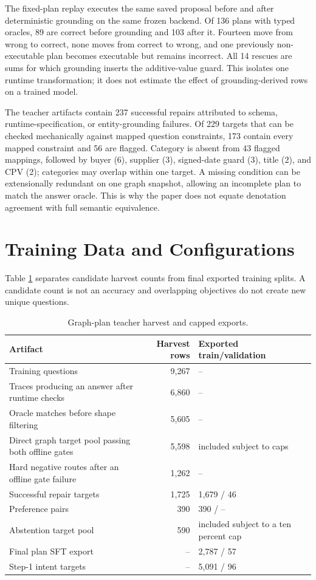 The fixed-plan replay executes the same saved proposal before and after deterministic grounding on
the same frozen backend.  Of 136 plans with typed oracles, 89 are correct before grounding and 103
after it.  Fourteen move from wrong to correct, none moves from correct to wrong, and one previously
non-executable plan becomes executable but remains incorrect.  All 14 rescues are sums for which
grounding inserts the additive-value guard.  This isolates one runtime transformation; it does not
estimate the effect of grounding-derived rows on a trained model.

The teacher artifacts contain 237 successful repairs attributed to schema, runtime-specification,
or entity-grounding failures.  Of 229 targets that can be checked mechanically against mapped
question constraints, 173 contain every mapped constraint and 56 are flagged.  Category is absent
from 43 flagged mappings, followed by buyer (6), supplier (3), signed-date guard (3), title (2), and
CPV (2); categories may overlap within one target.  A missing condition can be extensionally
redundant on one graph snapshot, allowing an incomplete plan to match the answer oracle.  This is
why the paper does not equate denotation agreement with full semantic equivalence.

\section{Training Data and Configurations}
\label{app:config}

Table \ref{tab:training-data} separates candidate harvest counts from final exported training
splits.  A candidate count is not an accuracy and overlapping objectives do not create new unique
questions.

\begin{table}[h]
  \centering
  \caption{Graph-plan teacher harvest and capped exports.}
  \label{tab:training-data}
  \small
  \begin{tabularx}{\linewidth}{XrX}
    \toprule
    Artifact & Harvest rows & Exported train/validation \\
    \midrule
    Training questions & 9,267 & -- \\
    Traces producing an answer after runtime checks & 6,860 & -- \\
    Oracle matches before shape filtering & 5,605 & -- \\
    Direct graph target pool passing both offline gates & 5,598 & included subject to caps \\
    Hard negative routes after an offline gate failure & 1,262 & -- \\
    Successful repair targets & 1,725 & 1,679 / 46 \\
    Preference pairs & 390 & 390 / -- \\
    Abstention target pool & 590 & included subject to a ten percent cap \\
    Final plan SFT export & -- & 2,787 / 57 \\
    Step-1 intent targets & -- & 5,091 / 96 \\
    \bottomrule
  \end{tabularx}
\end{table}

